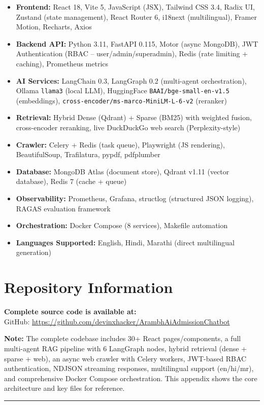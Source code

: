 \begin{itemize}
\item \textbf{Frontend:} React 18, Vite 5, JavaScript (JSX), Tailwind CSS 3.4, Radix UI, Zustand (state management), React Router 6, i18next (multilingual), Framer Motion, Recharts, Axios
\item \textbf{Backend API:} Python 3.11, FastAPI 0.115, Motor (async MongoDB), JWT Authentication (RBAC -- user/admin/superadmin), Redis (rate limiting + caching), Prometheus metrics
\item \textbf{AI Services:} LangChain 0.3, LangGraph 0.2 (multi-agent orchestration), Ollama \texttt{llama3} (local LLM), HuggingFace \texttt{BAAI/bge-small-en-v1.5} (embeddings), \texttt{cross-encoder/ms-marco-MiniLM-L-6-v2} (reranker)
\item \textbf{Retrieval:} Hybrid Dense (Qdrant) + Sparse (BM25) with weighted fusion, cross-encoder reranking, live DuckDuckGo web search (Perplexity-style)
\item \textbf{Crawler:} Celery + Redis (task queue), Playwright (JS rendering), BeautifulSoup, Trafilatura, pypdf, pdfplumber
\item \textbf{Database:} MongoDB Atlas (document store), Qdrant v1.11 (vector database), Redis 7 (cache + queue)
\item \textbf{Observability:} Prometheus, Grafana, structlog (structured JSON logging), RAGAS evaluation framework
\item \textbf{Orchestration:} Docker Compose (8 services), Makefile automation
\item \textbf{Languages Supported:} English, Hindi, Marathi (direct multilingual generation)
\end{itemize}

\section*{Repository Information}

\textbf{Complete source code is available at:} \\
GitHub: \url{https://github.com/devinxhacker/ArambhAiAdmissionChatbot}

\vspace{5mm}

\textbf{Note:} The complete codebase includes 30+ React pages/components, a full multi-agent RAG pipeline with 6 LangGraph nodes, hybrid retrieval (dense + sparse + web), an async web crawler with Celery workers, JWT-based RBAC authentication, NDJSON streaming responses, multilingual support (en/hi/mr), and comprehensive Docker Compose orchestration. This appendix shows the core architecture and key files for reference.

\vspace{10mm}
\hrule
